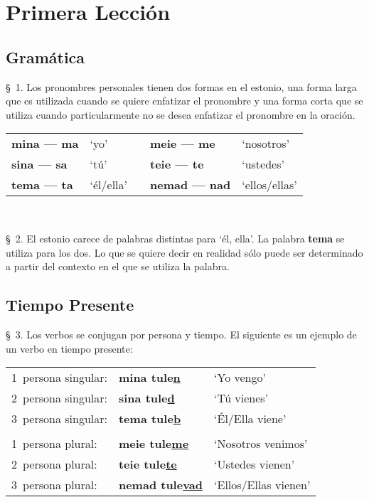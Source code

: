 
\chapter{Primera Lección} %

\label{ch:lesson01} %


\Large{\section{Gramática}}

\S\ 1. Los pronombres personales tienen dos formas en el estonio, una forma larga que es utilizada cuando se quiere enfatizar el pronombre y una forma corta que se utiliza cuando particularmente no se desea enfatizar el pronombre en la oración.\\

\begin{tabular}{ l l c l l }
	\textbf{mina — ma} & `yo'		& &	\textbf{meie — me} 	& `nosotros' \\
	\textbf{sina — sa} & `tú'		& &	\textbf{teie — te}	& `ustedes' \\
	\textbf{tema — ta} & `él/ella'	& &	\textbf{nemad — nad}&`ellos/ellas'
\end{tabular}\\ \bigskip

\S\ 2. El estonio carece de palabras distintas para `él, ella'. La palabra \textbf{tema} se utiliza para los dos. Lo que se quiere decir en realidad sólo puede ser determinado a partir del contexto en el que se utiliza la palabra.\\

\Large{\section{Tiempo Presente}}

\S\ 3. Los verbos se conjugan por persona y tiempo. El siguiente es un ejemplo de un verbo en tiempo presente:\\

\begin{tabular}{ l l l }
	1\textordmasculine\ persona singular: 	& \textbf{mina tule\underline{n}} 		& `Yo vengo' \\
	2\textordmasculine\ persona singular: 	& \textbf{sina tule\underline{d}} 		& `Tú vienes' \\
	3\textordmasculine\ persona singular: 	& \textbf{tema tule\underline{b}} 		& `Él/Ella viene' \\
	 & & \\
	1\textordmasculine\ persona plural:		& \textbf{meie tule\underline{me}} 		& `Nosotros venimos' \\
	2\textordmasculine\ persona plural:		& \textbf{teie tule\underline{te}} 		& `Ustedes vienen' \\
	3\textordmasculine\ persona plural:		& \textbf{nemad tule\underline{vad}} 	& `Ellos/Ellas vienen'
\end{tabular}\\ \bigskip


